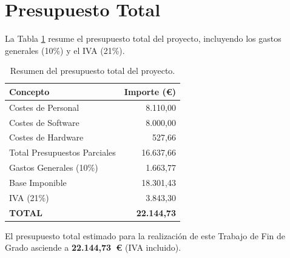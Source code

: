 \section{Presupuesto Total}

La Tabla \ref{tab:presupuesto_total} resume el presupuesto total del proyecto, incluyendo los gastos generales (10\%) y el IVA (21\%).

\begin{table}[htbp]
  \centering
  \renewcommand{\arraystretch}{1.3}
  \begin{tabular}{l r}
    \hline
    \textbf{Concepto}            & \textbf{Importe (\euro)} \\
    \hline
    Costes de Personal           & 8.110,00                 \\
    Costes de Software           & 8.000,00                 \\
    Costes de Hardware           & 527,66                   \\
    \hline
    Total Presupuestos Parciales & 16.637,66                \\
    Gastos Generales (10\%)      & 1.663,77                 \\
    \hline
    Base Imponible               & 18.301,43                \\
    IVA (21\%)                   & 3.843,30                 \\
    \hline
    \textbf{TOTAL}               & \textbf{22.144,73}       \\
    \hline
  \end{tabular}
  \caption{Resumen del presupuesto total del proyecto.}
  \label{tab:presupuesto_total}
\end{table}

El presupuesto total estimado para la realización de este Trabajo de Fin de Grado asciende a \textbf{22.144,73~\euro{}} (IVA incluido).
